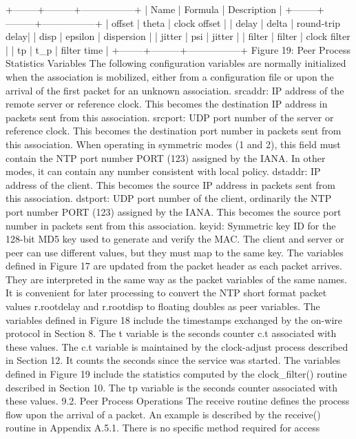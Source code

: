   +--------+---------+-----------------+
 | Name | Formula | Description |
 +--------+---------+-----------------+
 | offset | theta | clock offset |
 | delay | delta | round-trip delay|
 | disp | epsilon | dispersion |
 | jitter | psi | jitter |
 | filter | filter | clock filter |
 | tp | t_p | filter time |
 +--------+---------+-----------------+
 Figure 19: Peer Process Statistics Variables
 The following configuration variables are normally initialized when
 the association is mobilized, either from a configuration file or
 upon the arrival of the first packet for an unknown association.
 srcaddr: IP address of the remote server or reference clock. This
 becomes the destination IP address in packets sent from this
 association.
 srcport: UDP port number of the server or reference clock. This
 becomes the destination port number in packets sent from this
 association. When operating in symmetric modes (1 and 2), this field
 must contain the NTP port number PORT (123) assigned by the IANA. In
 other modes, it can contain any number consistent with local policy.
 dstaddr: IP address of the client. This becomes the source IP
 address in packets sent from this association.
 dstport: UDP port number of the client, ordinarily the NTP port
 number PORT (123) assigned by the IANA. This becomes the source port
 number in packets sent from this association.
 keyid: Symmetric key ID for the 128-bit MD5 key used to generate and
 verify the MAC. The client and server or peer can use different
 values, but they must map to the same key.
 The variables defined in Figure 17 are updated from the packet header
 as each packet arrives. They are interpreted in the same way as the
 packet variables of the same names. It is convenient for later
 processing to convert the NTP short format packet values r.rootdelay
 and r.rootdisp to floating doubles as peer variables.
 The variables defined in Figure 18 include the timestamps exchanged
 by the on-wire protocol in Section 8. The t variable is the seconds
 counter c.t associated with these values. The c.t variable is
 maintained by the clock-adjust process described in Section 12. It
 counts the seconds since the service was started. The variables
 defined in Figure 19 include the statistics computed by the
 clock_filter() routine described in Section 10. The tp variable is
 the seconds counter associated with these values.
9.2. Peer Process Operations
 The receive routine defines the process flow upon the arrival of a
 packet. An example is described by the receive() routine in
 Appendix A.5.1. There is no specific method required for access
